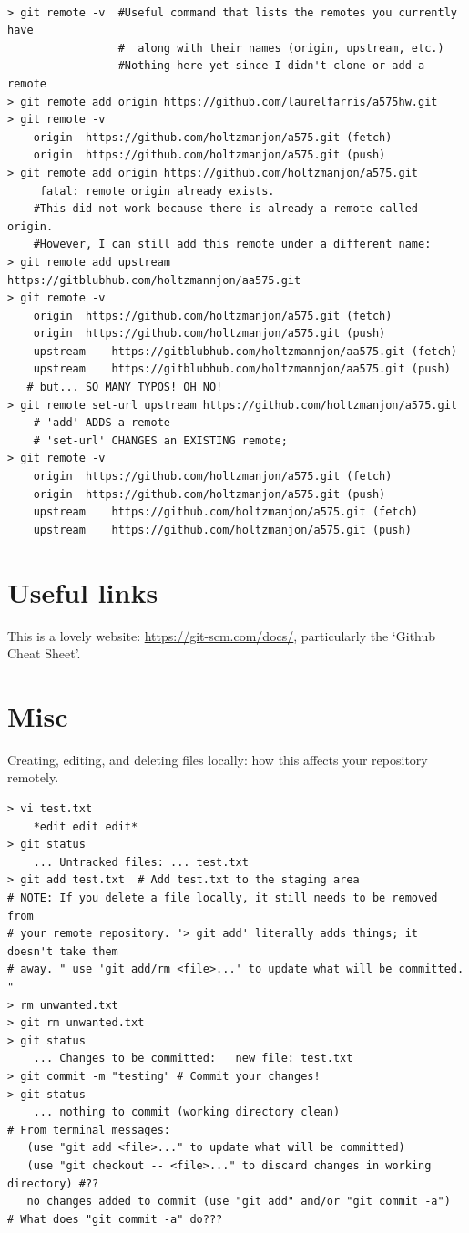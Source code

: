\documentclass{article}
\begin{document}
\begin{verbatim}

> git remote -v  #Useful command that lists the remotes you currently have
                 #  along with their names (origin, upstream, etc.)
                 #Nothing here yet since I didn't clone or add a remote
> git remote add origin https://github.com/laurelfarris/a575hw.git
> git remote -v
    origin  https://github.com/holtzmanjon/a575.git (fetch)
    origin  https://github.com/holtzmanjon/a575.git (push)
> git remote add origin https://github.com/holtzmanjon/a575.git
     fatal: remote origin already exists.
    #This did not work because there is already a remote called origin.
    #However, I can still add this remote under a different name:
> git remote add upstream https://gitblubhub.com/holtzmannjon/aa575.git
> git remote -v
	origin	https://github.com/holtzmanjon/a575.git (fetch)
	origin	https://github.com/holtzmanjon/a575.git (push)
	upstream	https://gitblubhub.com/holtzmannjon/aa575.git (fetch)
	upstream	https://gitblubhub.com/holtzmannjon/aa575.git (push)
   # but... SO MANY TYPOS! OH NO!
> git remote set-url upstream https://github.com/holtzmanjon/a575.git
    # 'add' ADDS a remote
    # 'set-url' CHANGES an EXISTING remote;
> git remote -v
	origin	https://github.com/holtzmanjon/a575.git (fetch)
	origin	https://github.com/holtzmanjon/a575.git (push)
	upstream	https://github.com/holtzmanjon/a575.git (fetch)
	upstream	https://github.com/holtzmanjon/a575.git (push)

\end{verbatim}


\section{Useful links}
This is a lovely website:
\url{https://git-scm.com/docs/}, particularly the
`Github Cheat Sheet'.

\section{Misc}
Creating, editing, and deleting files locally: how this affects your
repository remotely.
\begin{verbatim}
> vi test.txt
    *edit edit edit*
> git status
    ... Untracked files: ... test.txt
> git add test.txt  # Add test.txt to the staging area
# NOTE: If you delete a file locally, it still needs to be removed from
# your remote repository. '> git add' literally adds things; it doesn't take them
# away. " use 'git add/rm <file>...' to update what will be committed. "
> rm unwanted.txt
> git rm unwanted.txt
> git status
    ... Changes to be committed:   new file: test.txt
> git commit -m "testing" # Commit your changes!
> git status
    ... nothing to commit (working directory clean)
# From terminal messages:
   (use "git add <file>..." to update what will be committed)
   (use "git checkout -- <file>..." to discard changes in working directory) #??
   no changes added to commit (use "git add" and/or "git commit -a")
# What does "git commit -a" do???
\end{verbatim}
\end{document}
